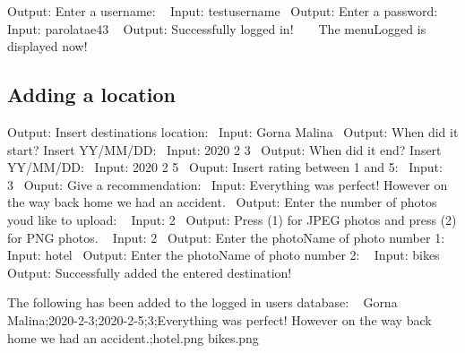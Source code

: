  Output\+: Enter a username\+: ~\newline
 Input\+: testusername~\newline
 Output\+: Enter a password\+: ~\newline
 Input\+: parolatae43 ~\newline
 Output\+: Successfully logged in! ~\newline
 ~\newline
 The menu\+Logged is displayed now! ~\newline
\hypertarget{index_locadd}{}\subsection{Adding a location}\label{index_locadd}
Output\+: Insert destination\textquotesingle{}s location\+:~\newline
 Input\+: Gorna Malina~\newline
 Output\+: When did it start? Insert Y\+Y/\+M\+M/\+DD\+:~\newline
 Input\+: 2020 2 3~\newline
 Output\+: When did it end? Insert Y\+Y/\+M\+M/\+DD\+:~\newline
 Input\+: 2020 2 5~\newline
 Ouput\+: Insert rating between 1 and 5\+:~\newline
 Input\+: 3~\newline
 Ouput\+: Give a recommendation\+:~\newline
 Input\+: Everything was perfect! However on the way back home we had an accident.~\newline
 Output\+: Enter the number of photos you\textquotesingle{}d like to upload\+: ~\newline
 Input\+: 2~\newline
 Output\+: Press (1) for J\+P\+EG photos and press (2) for P\+NG photos. ~\newline
 Input\+: 2~\newline
 Output\+: Enter the photo\+Name of photo number 1\+: ~\newline
 Input\+: hotel~\newline
 Output\+: Enter the photo\+Name of photo number 2\+: ~\newline
 Input\+: bikes~\newline
 Output\+: Successfully added the entered destination!~\newline


The following has been added to the logged in user\textquotesingle{}s database\+: ~\newline
 Gorna Malina;2020-\/2-\/3;2020-\/2-\/5;3;Everything was perfect! However on the way back home we had an accident.;hotel.\+png bikes.\+png ~\newline
 